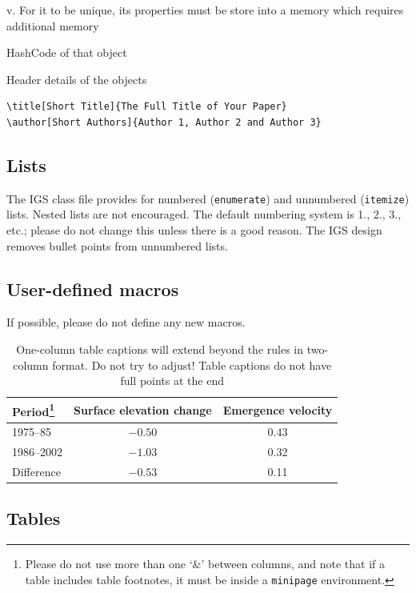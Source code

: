 \documentclass[aog]{igs}
\begin{document}
    v.  For it to be unique, its properties must be store into a memory which requires additional memory 
		    
		    HashCode of that object

      Header details of the objects
		    
		    

\begin{verbatim}
\title[Short Title]{The Full Title of Your Paper}
\author[Short Authors]{Author 1, Author 2 and Author 3}
\end{verbatim}

\subsection{Lists}
The IGS class file provides for numbered (\verb"enumerate") and unnumbered (\verb"itemize") lists. Nested lists are not encouraged. The default numbering system is 1., 2., 3., etc.; please do not change this unless there is a good reason. The IGS design removes bullet points from unnumbered lists.

\subsection{User-defined macros}
If possible, please do not define any new macros.

\begin{table}%
\caption{One-column table captions will extend beyond
  the rules in two-column format. Do not try to adjust!
  Table captions do not have full points at the end}
\label{period}
\begin{minipage}{86mm}%
\begin{tabular}{@{}lcc}\hline
Period\footnote{Please do not use more than one `\&' 
  between columns, and note that if a table includes 
  table footnotes, it must be inside a \texttt{minipage} 
  environment.}%
  & Surface elevation change
  & Emergence velocity\\ \hline
1975--85   & $-0.50$ & 0.43\\
1986--2002 & $-1.03$ & 0.32\\
Difference & $-0.53$ & \llap{$-$}0.11
\end{tabular}
\end{minipage}%
\end{table}

\subsection{Tables}
\end{document}
